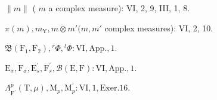 \(\| m\|\) ( \(m\) a complex measure): VI, 2, 9, III, 1, 8.

\(\pi (m), m_{\mathrm{Y}}, m \otimes m' (m, m'\) complex measures): VI, 2, 10.

\(\mathfrak{B}(\mathrm{F}_{1},\mathrm{F}_{2}),{}^{r}\Phi,{}^{l}\Phi :\mathrm{VI},\mathrm{App.},1.\)

\(\mathrm{E}_{\sigma}, \mathrm{F}_{\sigma}, \mathrm{E}_{s}^{\prime}, \mathrm{F}_{s}^{\prime}, \mathcal{B}(\mathrm{E}, \mathrm{F}) : \mathrm{VI}, \mathrm{App.}, 1.\)

\(\Lambda_{\mathrm{F}^{\prime}}^{p}(\mathrm{T},\mu),\mathrm{M}_{p},\mathrm{M}_{p}^{\prime}:\mathrm{VI},1,\mathrm{Exer.}16.\)
\relax{}
